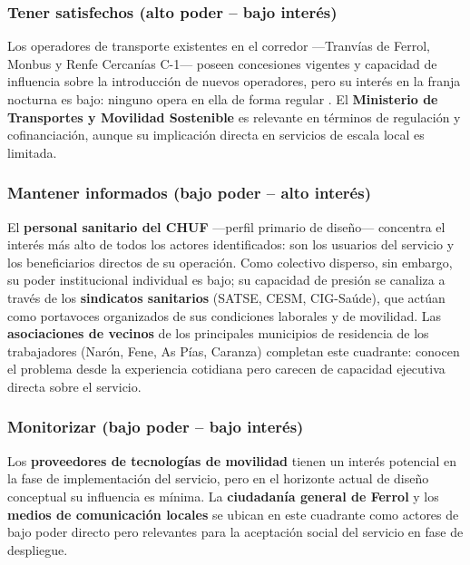 \subsubsection{Tener satisfechos (alto poder -- bajo interés)}

Los operadores de transporte existentes en el corredor ---Tranvías de
Ferrol, Monbus y Renfe Cercanías C-1--- poseen concesiones vigentes y
capacidad de influencia sobre la introducción de nuevos operadores, pero
su interés en la franja nocturna es bajo: ninguno opera en ella de forma
regular \parencite{Alsaferrol2024horarios,RenfeCercaniasFerrol2026}. El
\textbf{Ministerio de Transportes y Movilidad Sostenible} es relevante
en términos de regulación y cofinanciación, aunque su implicación directa
en servicios de escala local es limitada.

\subsubsection{Mantener informados (bajo poder -- alto interés)}

El \textbf{personal sanitario del CHUF} ---perfil primario de diseño---
concentra el interés más alto de todos los actores identificados: son los
usuarios del servicio y los beneficiarios directos de su operación.
Como colectivo disperso, sin embargo, su poder institucional individual
es bajo; su capacidad de presión se canaliza a través de los
\textbf{sindicatos sanitarios} (SATSE, CESM, CIG-Saúde), que actúan como
portavoces organizados de sus condiciones laborales y de movilidad. Las
\textbf{asociaciones de vecinos} de los principales municipios de
residencia de los trabajadores (Narón, Fene, As Pías, Caranza) completan
este cuadrante: conocen el problema desde la experiencia cotidiana pero
carecen de capacidad ejecutiva directa sobre el servicio.

\subsubsection{Monitorizar (bajo poder -- bajo interés)}

Los \textbf{proveedores de tecnologías de movilidad} tienen un interés
potencial en la fase de implementación del servicio, pero en el horizonte
actual de diseño conceptual su influencia es mínima. La
\textbf{ciudadanía general de Ferrol} y los \textbf{medios de
comunicación locales} se ubican en este cuadrante como actores de bajo
poder directo pero relevantes para la aceptación social del servicio en
fase de despliegue.
